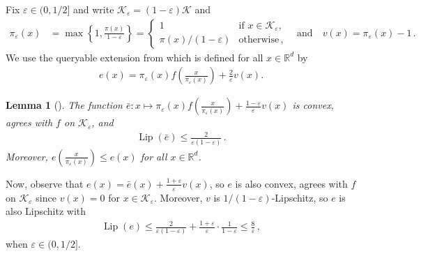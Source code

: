 \documentclass[11pt]{article}
\newtheorem{lemma}[lemma]{Lemma}
\newcommand{\R}{\mathbb R}
\newcommand{\K}{\mathcal K}
\newcommand{\Lip}{\operatorname{Lip}}
\newcommand{\1}{\mathbf 1}
\newcommand{\eps}{\varepsilon}
\begin{document}
Fix $\eps\in(0,1/2]$ and write $\K_\eps=(1-\eps)\K$ and
\begin{align}
    \pi_\eps(x)
     & =\max\left\{1,\frac{\pi(x)}{1-\eps}\right\}
    =\begin{cases}
         1               & \text{if }x\in\K_\eps, \\
         \pi(x)/(1-\eps) & \text{otherwise}\,,
     \end{cases}
    \quad\text{and}\quad v(x)=\pi_\eps(x)-1\,.
    \label{eq:extension-notation}
\end{align}
We use the queryable extension from
\citet[Eq.~(10.6)]{lattimore2026bandit} which is defined for all $x\in\R^d$ by
\begin{align}
    e(x)
    =\pi_\eps(x)f\!\left(\frac{x}{\pi_\eps(x)}\right)
    +\frac{2}{\eps}v(x).
    \label{eq:extension}
\end{align}
\begin{lemma}[{\citet[Proposition~3.23]{lattimore2026bandit}}]
    \label{lem:extension}
    The function $\bar{e}:
        x
        \longmapsto
        \pi_\eps(x)
        f\!\left(\frac{x}{\pi_\eps(x)}\right)
        +
        \frac{1-\eps}{\eps}v(x)
    $ is convex, agrees with $f$ on $\K_\eps$, and
    \begin{align}
        \Lip(\bar e)\leq\frac{2}{\eps(1-\eps)}\,.
    \end{align}
    Moreover,
    $e\!\left(\frac{x}{\pi_\eps(x)}\right)\leq e(x)$
    for all $x\in\R^d$.
\end{lemma}
Now, observe that $e(x)=\bar e(x)+\frac{1+\eps}{\eps}v(x)$, so $e$ is also convex, agrees with $f$ on $\K_\eps$ since $v(x)=0$ for $x\in\K_\eps$.
Moreover, $v$ is $1/(1-\eps)$-Lipschitz, so $e$ is also Lipschitz with
\begin{align}
    \Lip(e)\leq\frac{2}{\eps(1-\eps)}+\frac{1+\eps}{\eps}\cdot\frac{1}{1-\eps}\leq\frac{8}{\eps}\,,
    \label{eq:extension-lipschitz}
\end{align}
when $\eps\in(0,1/2]$.
\end{document}
